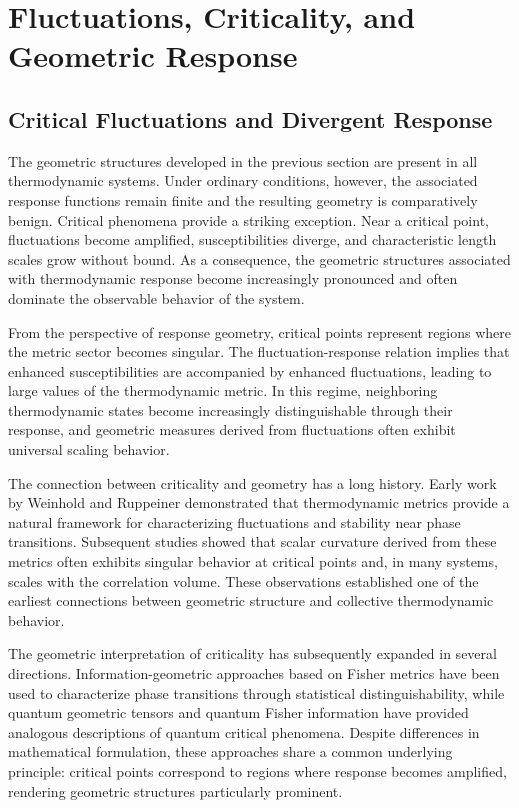 \section{Fluctuations, Criticality, and Geometric Response}
\label{sec:response}

\subsection{Critical Fluctuations and Divergent Response}

The geometric structures developed in the previous section are present in all thermodynamic systems. Under ordinary conditions, however, the associated response functions remain finite and the resulting geometry is comparatively benign. Critical phenomena provide a striking exception. Near a critical point, fluctuations become amplified, susceptibilities diverge, and characteristic length scales grow without bound. As a consequence, the geometric structures associated with thermodynamic response become increasingly pronounced and often dominate the observable behavior of the system.

From the perspective of response geometry, critical points represent regions where the metric sector becomes singular. The fluctuation-response relation implies that enhanced susceptibilities are accompanied by enhanced fluctuations, leading to large values of the thermodynamic metric. In this regime, neighboring thermodynamic states become increasingly distinguishable through their response, and geometric measures derived from fluctuations often exhibit universal scaling behavior.

The connection between criticality and geometry has a long history. Early work by Weinhold and Ruppeiner demonstrated that thermodynamic metrics provide a natural framework for characterizing fluctuations and stability near phase transitions. Subsequent studies showed that scalar curvature derived from these metrics often exhibits singular behavior at critical points and, in many systems, scales with the correlation volume. These observations established one of the earliest connections between geometric structure and collective thermodynamic behavior.

The geometric interpretation of criticality has subsequently expanded in several directions. Information-geometric approaches based on Fisher metrics have been used to characterize phase transitions through statistical distinguishability, while quantum geometric tensors and quantum Fisher information have provided analogous descriptions of quantum critical phenomena. Despite differences in mathematical formulation, these approaches share a common underlying principle: critical points correspond to regions where response becomes amplified, rendering geometric structures particularly prominent.

